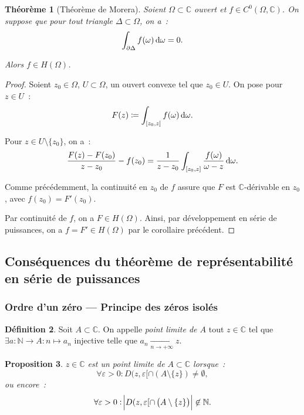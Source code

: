 \documentclass{report}
\newtheorem{thm}{Théorème}[chapter]
\newtheorem{prp}[thm]{Proposition}
\theoremstyle{definition}
\newtheorem{déf}[thm]{Définition}
\theoremstyle{remark}
\numberwithin{equation}{section}
\newcommand{\C}{\mathbb C}
\newcommand{\N}{\mathbb N}
\newcommand{\pinfty}{{+\infty}}
\begin{document}
			\begin{thm}[Théorème de Morera] Soient $\Omega \subset \C$ ouvert et $f \in C^0(\Omega, \C)$. On suppose que pour tout triangle $\Delta \subset \Omega$,
			on a~:
			\begin{equation}
				\int_{\partial \Delta} f(\omega)\dif \omega = 0.
			\end{equation}

			Alors $f \in H(\Omega)$.
			\end{thm}

			\begin{proof} Soient $z_0 \in \Omega$, $U \subset \Omega$, un ouvert convexe tel que $z_0 \in U$. On pose pour $z \in U$~:
			\begin{equation}
				F(z) \coloneqq \int_{[z_0, z]}f(\omega) \dif \omega.
			\end{equation}

			Pour $z \in U \setminus \{z_0\}$, on a~:
			\begin{equation}
				\frac {F(z) - F(z_0)}{z-z_0} - f(z_0) = \frac 1{z-z_0}\int_{[z_0, z]}\frac {f(\omega)}{\omega-z}\dif \omega.
			\end{equation}

			Comme précédemment, la continuité en $z_0$ de $f$ assure que $F$ est $\C$-dérivable en $z_0$, avec $f(z_0) = F'(z_0)$.

			Par continuité de $f$, on a $F \in H(\Omega)$. Ainsi, par développement en série de puissances, on a $f = F' \in H(\Omega)$ par le corollaire précédent.
			\end{proof}

	\subsection{Conséquences du théorème de représentabilité en série de puissances}
		\subsubsection{Ordre d'un zéro --- Principe des zéros isolés}
			\begin{déf} Soit $A \subset \C$. On appelle \textit{point limite de $A$} tout $z \in \C$ tel que $\exists a : \N \to A : n \mapsto a_n$ injective
			telle que $a_n \xrightarrow[n \to \pinfty]{} z$.
			\end{déf}

			\begin{prp} $z \in \C$ est un point limite de $A \subset \C$ lorsque~:
			\begin{equation}
				\forall \varepsilon > 0 : D(z, \varepsilon[ \cap \left(A \setminus \{z\}\right) \neq \emptyset,
			\end{equation}
			ou encore~:
			\begin{equation}
				\forall \varepsilon > 0 : \abs {D(z, \varepsilon[ \cap \left(A \setminus \{z\}\right)} \not \in \N.
			\end{equation}
			\end{prp}
\end{document}
